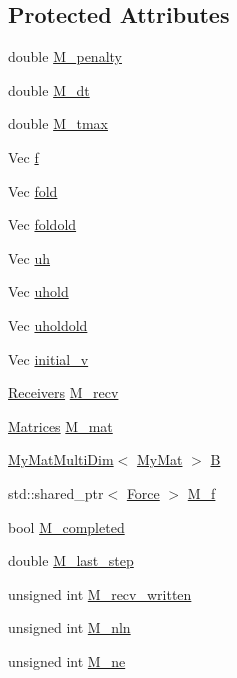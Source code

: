 \subsection*{Protected Attributes}
\begin{DoxyCompactItemize}
\item 
double \hyperlink{classTspeed_1_1TimeAdvance_a153eb7bdf6d8034242dacdd3cdbf9950}{M\-\_\-penalty}
\item 
double \hyperlink{classTspeed_1_1TimeAdvance_aa1397f45ca8bcebaf879ca5e98d9daca}{M\-\_\-dt}
\item 
double \hyperlink{classTspeed_1_1TimeAdvance_a935eb9282bdd63bf94190f209a58756a}{M\-\_\-tmax}
\item 
Vec \hyperlink{classTspeed_1_1TimeAdvance_a36dea2ae6ba03546806bbacb83697c01}{f}
\item 
Vec \hyperlink{classTspeed_1_1TimeAdvance_a3cfbea04f0116183c5ac4ec59282d3e8}{fold}
\item 
Vec \hyperlink{classTspeed_1_1TimeAdvance_aac8169dc52fa2b5f00c87328707b9b26}{foldold}
\item 
Vec \hyperlink{classTspeed_1_1TimeAdvance_ab453aee6ca36887379834a7a228989d0}{uh}
\item 
Vec \hyperlink{classTspeed_1_1TimeAdvance_a5b8df69f25e0c457f1e6d1c7c6ed77e2}{uhold}
\item 
Vec \hyperlink{classTspeed_1_1TimeAdvance_a226deb2e9c8d165ad896bceb92c1330c}{uholdold}
\item 
Vec \hyperlink{classTspeed_1_1TimeAdvance_a981832947c160ad5471d63de23a37829}{initial\-\_\-v}
\item 
\hyperlink{classTspeed_1_1Receivers}{Receivers} \hyperlink{classTspeed_1_1TimeAdvance_a5e1ffc2d89b385049c83b446101ecca7}{M\-\_\-recv}
\item 
\hyperlink{classTspeed_1_1Matrices}{Matrices} \hyperlink{classTspeed_1_1TimeAdvance_aa8716f36ac9a3e725d9a2343e25efec3}{M\-\_\-mat}
\item 
\hyperlink{classTspeed_1_1MyMatMultiDim}{My\-Mat\-Multi\-Dim}$<$ \hyperlink{classTspeed_1_1MyMat}{My\-Mat} $>$ \hyperlink{classTspeed_1_1TimeAdvance_a10e673f4de9933dec049cb65261314ad}{B}
\item 
std\-::shared\-\_\-ptr$<$ \hyperlink{classTspeed_1_1Force}{Force} $>$ \hyperlink{classTspeed_1_1TimeAdvance_a2680ceda17b7629d86a866ab0e4754a6}{M\-\_\-f}
\item 
bool \hyperlink{classTspeed_1_1TimeAdvance_a7a14b1e98e28bded2816b27dabf44cb7}{M\-\_\-completed}
\item 
double \hyperlink{classTspeed_1_1TimeAdvance_a70a2f155f8dffcf2147ed52d208188f7}{M\-\_\-last\-\_\-step}
\item 
unsigned int \hyperlink{classTspeed_1_1TimeAdvance_a6ec24e3069ed3b6aa51af9ca09e9f727}{M\-\_\-recv\-\_\-written}
\item 
unsigned int \hyperlink{classTspeed_1_1TimeAdvance_a6c74b64240341a94c1e10b1bb9d20ae3}{M\-\_\-nln}
\item 
unsigned int \hyperlink{classTspeed_1_1TimeAdvance_aa03110e12846960054b42b4cf0d05b54}{M\-\_\-ne}
\end{DoxyCompactItemize}


